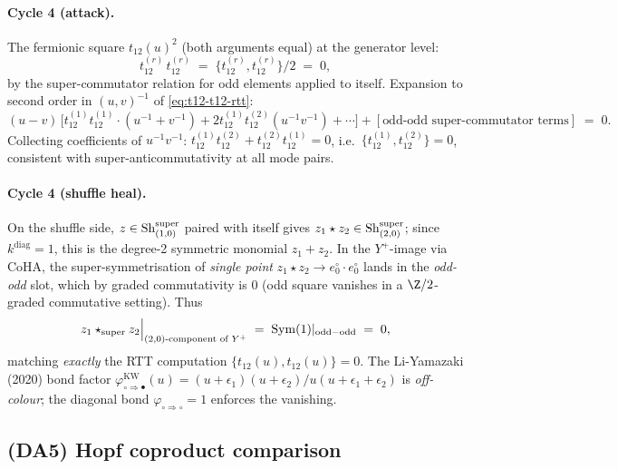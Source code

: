 \paragraph{Cycle 4 (attack).} The fermionic square
$t_{12}(u)^2$ (both arguments equal) at the generator level:
\[
  t^{(r)}_{12}\, t^{(r)}_{12}
  \;=\;
  \{t^{(r)}_{12}, t^{(r)}_{12}\}/2
  \;=\;
  0,
\]
by the super-commutator relation for odd elements applied to
itself. Expansion to second order in $(u,v)^{-1}$ of
\eqref{eq:t12-t12-rtt}:
\[
  (u-v)\,\bigl[t^{(1)}_{12}t^{(1)}_{12}\cdot(u^{-1}+v^{-1})
  + 2 t^{(1)}_{12}t^{(2)}_{12}(u^{-1}v^{-1})
  + \cdots\bigr]
  + [\text{odd-odd super-commutator terms}]
  \;=\; 0.
\]
Collecting coefficients of $u^{-1}v^{-1}$: $t^{(1)}_{12}t^{(2)}_{12} +
t^{(2)}_{12}t^{(1)}_{12} = 0$, i.e.\ $\{t^{(1)}_{12}, t^{(2)}_{12}\} =
0$, consistent with super-anticommutativity at all mode pairs.

\paragraph{Cycle 4 (shuffle heal).} On the shuffle side,
$z \in \mathrm{Sh}^{\mathrm{super}}_{(1,0)}$ paired with itself gives
$z_1 \star z_2 \in \mathrm{Sh}^{\mathrm{super}}_{(2,0)}$; since
$k^{\mathrm{diag}} = 1$, this is the degree-2 symmetric monomial
$z_1 + z_2$. In the $Y^+$-image via CoHA, the super-symmetrisation of
\emph{single point} $z_1 \star z_2 \to e^\circ_0 \cdot e^\circ_0$
lands in the \emph{odd-odd} slot, which by graded commutativity is
$0$ (odd square vanishes in a $\Z/2$-graded commutative setting). Thus
\[
  z_1 \star_{\mathrm{super}} z_2 \Big|_{(2,0)\text{-component of }Y^+}
  \;=\; \mathrm{Sym}(1)|_{\mathrm{odd-odd}} \;=\; 0,
\]
matching \emph{exactly} the RTT computation $\{t_{12}(u), t_{12}(u)\} = 0$.
The Li-Yamazaki (2020) bond factor
$\varphi_{\circ\Rightarrow\bullet}^{\mathrm{KW}}(u) =
(u+\epsilon_1)(u+\epsilon_2)/u(u+\epsilon_1+\epsilon_2)$ is
\emph{off-colour}; the diagonal bond $\varphi_{\circ\Rightarrow\circ} = 1$
enforces the vanishing.

\subsection*{(DA5) Hopf coproduct comparison}

